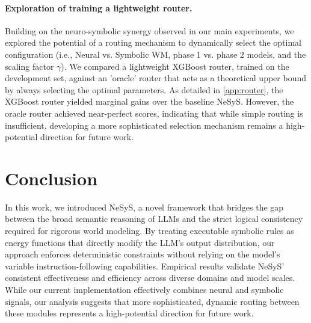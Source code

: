 \documentclass{article}
\theoremstyle{plain}
\theoremstyle{definition}
\theoremstyle{remark}
\newcommand{\ours}{{\sc NeSyS}\xspace}
\begin{document}
\paragraph{Exploration of training a lightweight router.} 
Building on the neuro-symbolic synergy observed in our main experiments, we explored the potential of a routing mechanism to dynamically select the optimal configuration (i.e., Neural vs. Symbolic WM, phase 1 vs. phase 2 models, and the scaling factor $\gamma$). We compared a lightweight XGBoost router, trained on the development set, against an 'oracle' router that acts as a theoretical upper bound by always selecting the optimal parameters. As detailed in \cref{app:router}, the XGBoost router yielded marginal gains over the baseline \ours. However, the oracle router achieved near-perfect scores, indicating that while simple routing is insufficient, developing a more sophisticated selection mechanism remains a high-potential direction for future work.

\section{Conclusion} \label{sec:conclusion}
In this work, we introduced \ours, a novel framework that bridges the gap between the broad semantic reasoning of LLMs and the strict logical consistency required for rigorous world modeling. By treating executable symbolic rules as energy functions that directly modify the LLM's output distribution, our approach enforces deterministic constraints without relying on the model's variable instruction-following capabilities. Empirical results validate \ours' consistent effectiveness and efficiency across diverse domains and model scales. While our current implementation effectively combines neural and symbolic signals, our analysis suggests that more sophisticated, dynamic routing between these modules represents a high-potential direction for future work. %


\end{document}
